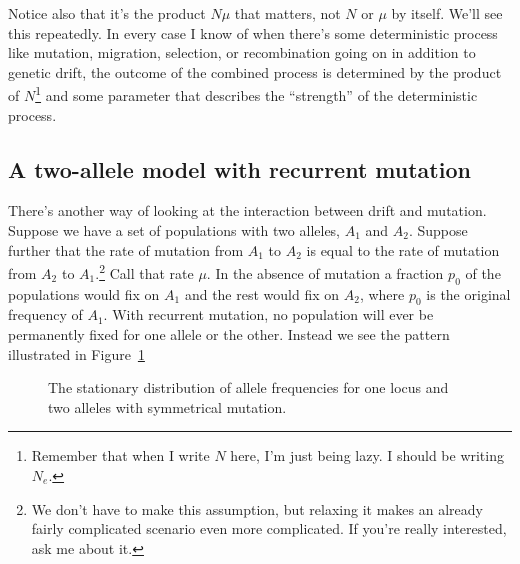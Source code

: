 \documentclass[12pt]{article}
\begin{document}
Notice also that it's the product $N\mu$ that matters, not $N$ or
$\mu$ by itself. We'll see this repeatedly. In every case I know of
when there's some deterministic process like mutation, migration,
selection, or recombination going on in addition to genetic drift, the
outcome of the combined process is determined by the product of
$N$\footnote{Remember that when I write $N$ here, I'm just being
  lazy. I should be writing $N_e$.} and some parameter that describes
the ``strength'' of the deterministic process.

\subsection*{A two-allele model with recurrent mutation}

There's another way of looking at the interaction between drift and
mutation. Suppose we have a set of populations with two alleles, $A_1$
and $A_2$. Suppose further that the rate of mutation from $A_1$ to
$A_2$ is equal to the rate of mutation from $A_2$ to
$A_1$.\footnote{We don't have to make this assumption, but relaxing it
  makes an already fairly complicated scenario even more
  complicated. If you're really interested, ask me about it.} Call
that rate $\mu$. In the absence of mutation a fraction $p_0$ of the
populations would fix on $A_1$ and the rest would fix on $A_2$, where
$p_0$ is the original frequency of $A_1$. With recurrent mutation, no
population will ever be permanently fixed for one allele or the
other. Instead we see the pattern illustrated in Figure~\ref{fig:drift-mutation}

\begin{figure}
\begin{center}
\end{center}
\caption{The stationary distribution of allele frequencies for one
  locus and two alleles with symmetrical mutation.}\label{fig:drift-mutation}
\end{figure}
\end{document}
